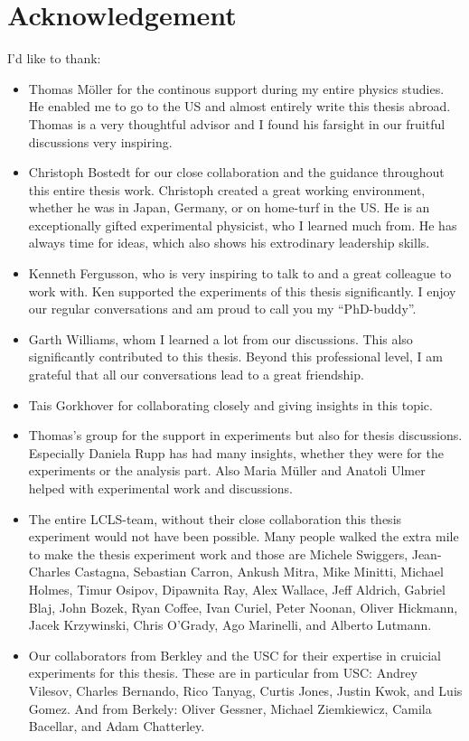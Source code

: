 \chapter{Acknowledgement}
I'd like to thank:
\begin{itemize}
\item Thomas Möller for the continous support during my entire physics studies. He enabled me to go to the US and almost entirely write this thesis abroad. Thomas is a very thoughtful advisor and I found his farsight in our fruitful discussions very inspiring.
%
\item Christoph Bostedt for our close collaboration and the guidance throughout this entire thesis work. Christoph created a great working environment, whether he was in Japan, Germany, or on home-turf in the US. He is an exceptionally gifted experimental physicist, who I learned much from. He has always time for ideas, which also shows his extrodinary leadership skills.
%
\item Kenneth Fergusson, who is very inspiring to talk to and a great colleague to work with. Ken supported the experiments of this thesis significantly. I enjoy our regular conversations and am proud to call you my ``PhD-buddy''.
%
\item Garth Williams, whom I learned a lot from our discussions. This also significantly contributed to this thesis. Beyond this professional level, I am grateful that all our conversations lead to a great friendship.
%
\item Tais Gorkhover for collaborating closely and giving insights in this topic.
%
\item Thomas's group for the support in experiments but also for thesis discussions. Especially Daniela Rupp has had many insights, whether they were for the experiments or the analysis part. Also Maria Müller and Anatoli Ulmer helped with experimental work and discussions.
%
\item The entire LCLS-team, without their close collaboration this thesis experiment would not have been possible. Many people walked the extra mile to make the thesis experiment work and those are Michele Swiggers, Jean-Charles Castagna, Sebastian Carron, Ankush Mitra, Mike Minitti, Michael Holmes, Timur Osipov, Dipawnita Ray, Alex Wallace, Jeff Aldrich, Gabriel Blaj, John Bozek, Ryan Coffee, Ivan Curiel, Peter Noonan, Oliver Hickmann, Jacek Krzywinski, Chris O'Grady, Ago Marinelli, and Alberto Lutmann.
%
\item Our collaborators from Berkley and the USC for their expertise in cruicial experiments for this thesis. These are in particular from USC: Andrey Vilesov, Charles Bernando, Rico Tanyag, Curtis Jones, Justin Kwok, and Luis Gomez. And from Berkely: Oliver Gessner, Michael Ziemkiewicz, Camila Bacellar, and Adam Chatterley.

\end{itemize}
